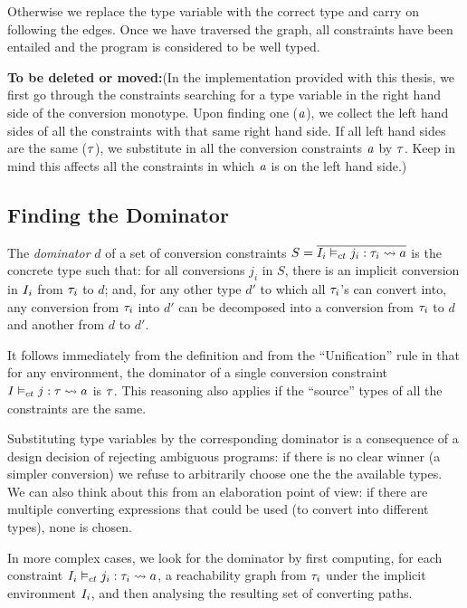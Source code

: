 Otherwise we replace the type variable with the correct type and carry on following the edges. Once we have traversed the graph, all constraints have been entailed and the program is considered to be well typed.

\textbf{To be deleted or moved:}(In the implementation provided with this thesis, we first go through the constraints searching for a type variable in the right hand side of the conversion monotype. Upon finding one ($\mathit{a}$), we collect the left hand sides of all the constraints with that same right hand side. If all left hand sides are the same ($\mathit{\tau}$), we substitute in all the conversion constraints $\mathit{a}$ by $\mathit{\tau}$. Keep in mind this affects all the constraints in which $\mathit{a}$ is on the left hand side.)

\subsection{Finding the Dominator}
The \textit{ dominator} $d$ of a set of conversion constraints $S=\overline{{I_i} \vDash_{ct} {j_i}: {\mathit{\tau}_i} \rightsquigarrow {a}}$ is the concrete type such that: for all conversions $j_i$ in $S$, there is an implicit conversion in $I_i$ from $\mathit{\tau}_i$ to $d$; and, for any other type $d'$ to which all $\mathit{\tau}_i$'s can convert into, any conversion from $\mathit{\tau}_i$ into $d'$ can be decomposed into a conversion from $\mathit{\tau}_i$ to $d$ and another from $d$ to $d'$.

It follows immediately from the definition and from the ``Unification'' rule in  that for any environment, the dominator of a single conversion constraint ${I} \vDash_{ct} {j}: {\mathit{\tau}} \rightsquigarrow {a}$ is $\mathit{\tau}$. This reasoning also applies if the ``source'' types of all the constraints are the same.

Substituting type variables by the corresponding dominator is a consequence of a design decision of rejecting ambiguous programs: if there is no clear winner (a simpler conversion) we refuse to arbitrarily choose one the the available types. We can also think about this from an elaboration point of view: if there are multiple converting expressions that could be used (to convert into different types), none is chosen.

In more complex cases, we look for the dominator by first computing, for each constraint ${I_i} \vDash_{ct} {j_i}: {\mathit{\tau}_{i}} \rightsquigarrow {a}$, a reachability graph from $\mathit{\tau}_i$ under the implicit environment $I_i$, and then analysing the resulting set of converting paths.

